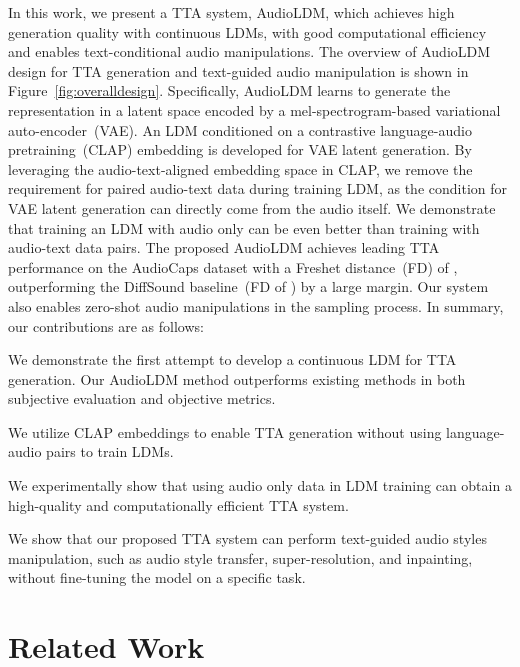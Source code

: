 \documentclass{article}
\begin{document}
In this work, we present a TTA system, AudioLDM, which achieves high generation quality with continuous LDMs, with good computational efficiency and enables text-conditional audio manipulations.
The overview of AudioLDM design for TTA generation and text-guided audio manipulation is shown in Figure~\ref{fig:overalldesign}. 
Specifically, AudioLDM learns to generate the representation in a latent space encoded by a mel-spectrogram-based variational auto-encoder~(VAE). An LDM conditioned on a contrastive language-audio pretraining~(CLAP) embedding is developed for VAE latent generation. By leveraging the audio-text-aligned embedding space in CLAP, we remove the requirement for paired audio-text data during training LDM, as the condition for VAE latent generation can directly come from the audio itself. We demonstrate that training an LDM with audio only can be even better than training with audio-text data pairs. The proposed AudioLDM achieves leading TTA performance on the AudioCaps dataset with a Freshet distance~(FD) of , outperforming the DiffSound baseline~(FD of ) by a large margin. Our system also enables zero-shot audio manipulations in the sampling process. In summary, our contributions are as follows:
\begin{list}{}{\leftmargin=1em}
    \setlength{\itemsep}{1pt}
    \setlength{\parskip}{0pt}
    \item We demonstrate the first attempt to develop a continuous LDM for TTA generation. Our AudioLDM method outperforms existing methods in both subjective evaluation and objective metrics.
    \item We utilize CLAP embeddings to enable TTA generation without using language-audio pairs to train LDMs. 
    \item We experimentally show that using audio only data in LDM training can obtain a high-quality and computationally efficient TTA system. 
    \item We show that our proposed TTA system can perform text-guided audio styles manipulation, such as audio style transfer, super-resolution, and inpainting, without fine-tuning the model on a specific task.
\end{list}










\section{Related Work}
\label{Background}
\end{document}
